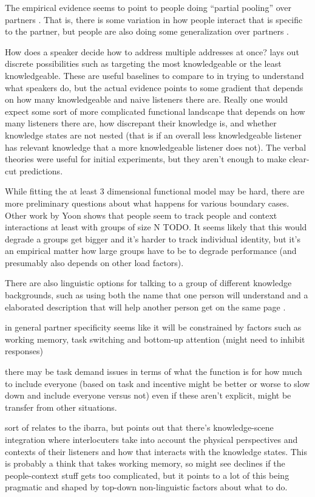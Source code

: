 \documentclass[]{article}
\begin{document}
The empirical evidence seems to point to people doing ``partial pooling'' over partners \cite{hawkins2021}. That is, there is some variation in how people interact that is specific to the partner, but people are also doing some generalization over partners \cite{yoon2014}. 

How does a speaker decide how to address multiple addresses at once? \cite{yoon2018} lays out discrete possibilities such as targeting the most knowledgeable or the least knowledgeable. These are useful baselines to compare to in trying to understand what speakers do, but the actual evidence points to some gradient that depends on how many knowledgeable and naive listeners there are.  Really one would expect some sort of more complicated functional landscape that depends on how many listeners there are, how discrepant their knowledge is, and whether knowledge states are not nested (that is if an overall less knowledgeable listener has relevant knowledge that a more knowledgeable listener does not). The verbal theories were useful for initial experiments, but they aren't enough to make clear-cut predictions. 

While fitting the at least 3 dimensional functional model may be hard, there are more preliminary questions about what happens for various boundary cases. Other work by Yoon shows that people seem to track people and context interactions at least with groups of size N TODO. It seems likely that this would degrade a groups get bigger and it's harder to track individual identity, but it's an empirical matter how large groups have to be to degrade performance (and presumably also depends on other load factors). 

There are also linguistic options for talking to a group of different knowledge backgrounds, such as using both the name that one person will understand and a elaborated description that will help another person get on the same page \cite{yoon2018}.


in general partner specificity seems like it will be constrained by factors such as working memory, task switching and bottom-up attention (might need to inhibit responses) 


\cite{yoon2019} there may be task demand issues in terms of what the function is for how much to include everyone (based on task and incentive might be better or worse to slow down and include everyone versus not) even if these aren't explicit, might be transfer from other situations. 

sort of relates to the ibarra, but \cite{yoon2019a} points out that there's knowledge-scene integration where interlocuters take into account the physical perspectives and contexts of their listeners and how that interacts with the knowledge states. This is probably a think that takes working memory, so might see declines if the people-context stuff gets too complicated, but it points to a lot of this being pragmatic and shaped by top-down non-linguistic factors about what to do. 
\end{document}
